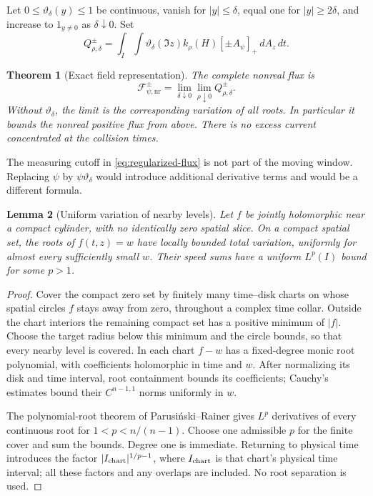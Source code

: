 \documentclass[11pt]{article}
\newcommand{\dd}{\,d}
\newcommand{\nr}{\mathrm{nr}}
\newcommand{\FF}{\mathcal F}
\newtheorem{theorem}{Theorem}[section]
\newtheorem{lemma}[theorem]{Lemma}
\theoremstyle{remark}
\begin{document}
Let $0\le\vartheta_\delta(y)\le1$ be continuous, vanish for $|y|\le\delta$,
equal one for $|y|\ge2\delta$, and increase to $1_{y\ne0}$ as
$\delta\downarrow0$. Set
\begin{equation}
 Q_{\rho,\delta}^{\pm}
 =\int_I\int\vartheta_\delta(\Im z)k_\rho(H)
          [\pm A_\psi]_+\dd A_z\dd t.
 \label{eq:regularized-flux}
\end{equation}

\begin{theorem}[Exact field representation]
\label{thm:current-limit}
The complete nonreal flux is
\begin{equation}
 \FF_{\psi,\nr}^{\pm}
   =\lim_{\delta\downarrow0}\lim_{\rho\downarrow0}
                    Q_{\rho,\delta}^{\pm}.
 \label{eq:nonreal-limit}
\end{equation}
Without $\vartheta_\delta$, the limit is the corresponding variation of
\emph{all} roots. In particular it bounds the nonreal positive flux
from above. There is no excess current concentrated at the collision
times.
\end{theorem}

The measuring cutoff in \eqref{eq:regularized-flux} is not part of the
moving window. Replacing $\psi$ by $\psi\vartheta_\delta$ would introduce
additional derivative terms and would be a different formula.

\begin{lemma}[Uniform variation of nearby levels]
\label{lem:levels}
Let $f$ be jointly holomorphic near a compact cylinder, with no identically
zero spatial slice. On a compact spatial set, the roots of $f(t,z)=w$
have locally bounded total variation, uniformly for almost every
sufficiently small $w$. Their speed sums have a uniform $L^p(I)$ bound
for some $p>1$.
\end{lemma}
\begin{proof}
Cover the compact zero set by finitely many time--disk charts on whose
spatial circles $f$ stays away from zero, throughout a complex time
collar. Outside the chart interiors the remaining compact set has a
positive minimum of $|f|$. Choose the target radius below this minimum
and the circle bounds, so that every nearby level is covered. In each
chart $f-w$ has a fixed-degree monic root polynomial, with coefficients
holomorphic in time and $w$. After normalizing its disk and time interval,
root containment bounds its coefficients; Cauchy's estimates bound their
$C^{n-1,1}$ norms uniformly in $w$.

The polynomial-root theorem of Parusi\'nski--Rainer
\cite[Theorem 1]{pr} gives $L^p$ derivatives of every continuous root
for $1<p<n/(n-1)$. Choose one admissible $p$ for the finite cover and
sum the bounds. Degree one is immediate. Returning to physical time
introduces the factor $|I_{\rm chart}|^{1/p-1}$, where
$I_{\rm chart}$ is that chart's physical time interval; all these
factors and any overlaps are included. No root separation is used.
\end{proof}
\end{document}
